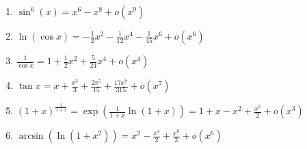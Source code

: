 {\begin{enumerate}
{\begin{enumerate}
  \item $\sin^6 (x)  =  x^6-x^8 + o(x^9)$

  \item $\ln(\cos x) =  - \frac{1}{2} x^2 -\frac{1}{12}x^4 -\frac{1}{45}x^6  + o(x^6)$

  \item $\frac{1}{\cos x} = 1+\frac{1}{2}x^2+\frac{5}{24}x^4 + o(x^4)$

  \item $\tan x = x + \frac{x^3}{3} + \frac{2x^5}{15} + \frac{17x^7}{315} + o(x^7)$

  \item $(1+x)^{\frac{1}{1+x}} =  \exp\left( \frac{1}{1+x} \ln(1+x) \right) = 1+x-x^2 + \frac{x^3}{2} + o(x^3)$

  \item  $\arcsin \left ( \ln(1+x^2) \right ) = x^2-\frac{x^4}{2}+\frac{x^6}{2}+o(x^6)$
\end{enumerate}}
\end{enumerate}
}
